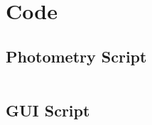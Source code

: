 \appendix

\chapter{Code}

\section{Photometry Script}
\inputminted{python}{/home/luke/Git/allsky/Photometry.py}

\section{GUI Script}
\inputminted{python}{/home/luke/Git/allsky/PhotometryGUI.py}
